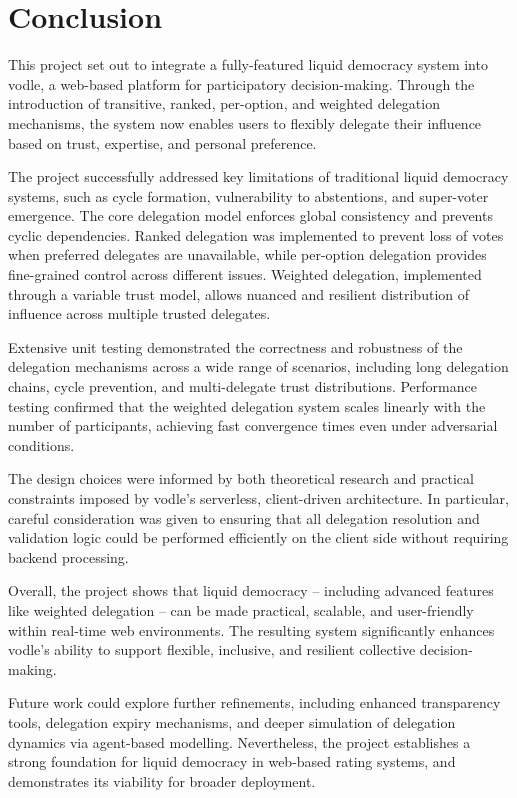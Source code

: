 \chapter{Conclusion}\label{ch:conclusions}
This project set out to integrate a fully-featured liquid democracy system into vodle, a web-based platform for participatory decision-making. Through the introduction of transitive, ranked, per-option, and weighted delegation mechanisms, the system now enables users to flexibly delegate their influence based on trust, expertise, and personal preference.

The project successfully addressed key limitations of traditional liquid democracy systems, such as cycle formation, vulnerability to abstentions, and super-voter emergence. The core delegation model enforces global consistency and prevents cyclic dependencies. Ranked delegation was implemented to prevent loss of votes when preferred delegates are unavailable, while per-option delegation provides fine-grained control across different issues. Weighted delegation, implemented through a variable trust model, allows nuanced and resilient distribution of influence across multiple trusted delegates.

Extensive unit testing demonstrated the correctness and robustness of the delegation mechanisms across a wide range of scenarios, including long delegation chains, cycle prevention, and multi-delegate trust distributions. Performance testing confirmed that the weighted delegation system scales linearly with the number of participants, achieving fast convergence times even under adversarial conditions.

The design choices were informed by both theoretical research and practical constraints imposed by vodle's serverless, client-driven architecture. In particular, careful consideration was given to ensuring that all delegation resolution and validation logic could be performed efficiently on the client side without requiring backend processing.

Overall, the project shows that liquid democracy -- including advanced features like weighted delegation -- can be made practical, scalable, and user-friendly within real-time web environments. The resulting system significantly enhances vodle's ability to support flexible, inclusive, and resilient collective decision-making.

Future work could explore further refinements, including enhanced transparency tools, delegation expiry mechanisms, and deeper simulation of delegation dynamics via agent-based modelling. Nevertheless, the project establishes a strong foundation for liquid democracy in web-based rating systems, and demonstrates its viability for broader deployment.


